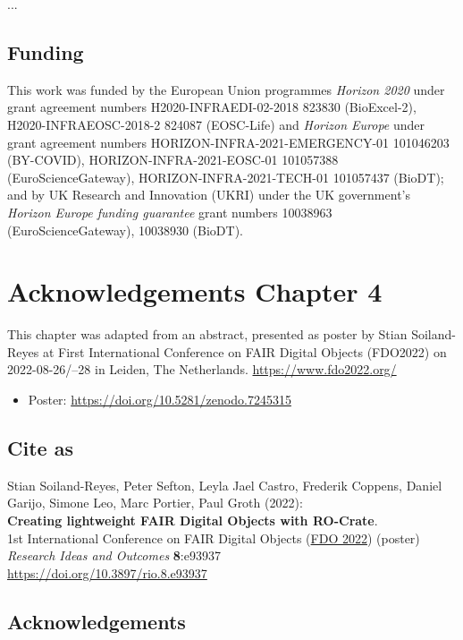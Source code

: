 ...

\subsection*{Funding}

This work was funded by the European Union programmes \emph{Horizon 2020} under grant agreement numbers H2020-INFRAEDI-02-2018 823830 (BioExcel-2), H2020-INFRAEOSC-2018-2 824087 (EOSC-Life) and \emph{Horizon Europe} under grant agreement numbers HORIZON-INFRA-2021-EMERGENCY-01 101046203 (BY-COVID), HORIZON-INFRA-2021-EOSC-01 101057388 (EuroScienceGateway), HORIZON-INFRA-2021-TECH-01 101057437 (BioDT); and by UK Research and Innovation (UKRI) under the UK government’s  \emph{Horizon Europe funding guarantee} grant numbers 10038963 (EuroScienceGateway), 10038930 (BioDT).





\section{Acknowledgements Chapter 4}

This chapter was adapted from an abstract, 
presented as poster by Stian Soiland-Reyes at 
First International Conference on FAIR Digital Objects 
(FDO2022) on
2022-08-26/--28 in Leiden, The Netherlands. 
\url{https://www.fdo2022.org/}

\begin{itemize}
\tightlist
\item
  Poster: \url{https://doi.org/10.5281/zenodo.7245315}
\end{itemize}

\subsection*{Cite as}
Stian Soiland-Reyes, Peter Sefton, Leyla Jael Castro, Frederik Coppens,
Daniel Garijo, Simone Leo, Marc Portier, Paul Groth (2022):\\
\textbf{Creating lightweight FAIR Digital Objects with RO-Crate}.\\
1st International Conference on FAIR Digital Objects
(\href{https://www.fdo2022.org/}{FDO 2022}) (poster)\\
\emph{Research Ideas and Outcomes} \textbf{8}:e93937\\
\url{https://doi.org/10.3897/rio.8.e93937}

\hypertarget{acknowledgements-1}{%
\subsection*{Acknowledgements}\label{acknowledgements-1}}

